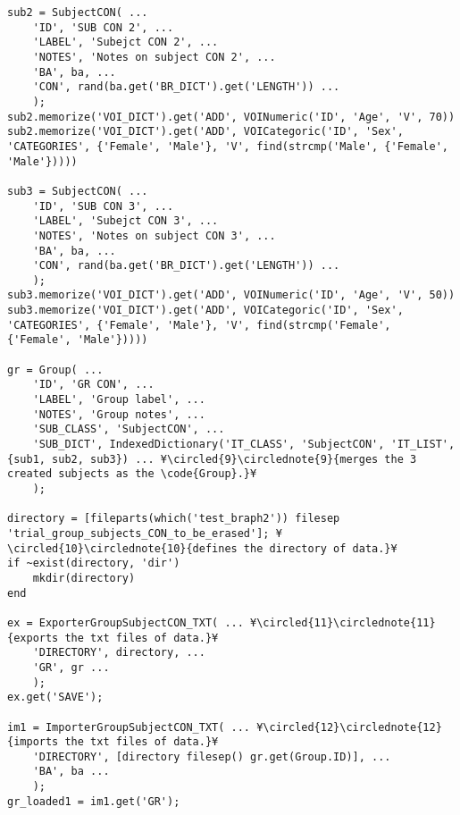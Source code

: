 \documentclass{tufte-handout}
\begin{document}
\begin{lstlisting}
sub2 = SubjectCON( ...
    'ID', 'SUB CON 2', ...
    'LABEL', 'Subejct CON 2', ...
    'NOTES', 'Notes on subject CON 2', ...
    'BA', ba, ...
    'CON', rand(ba.get('BR_DICT').get('LENGTH')) ...
    );
sub2.memorize('VOI_DICT').get('ADD', VOINumeric('ID', 'Age', 'V', 70))
sub2.memorize('VOI_DICT').get('ADD', VOICategoric('ID', 'Sex', 'CATEGORIES', {'Female', 'Male'}, 'V', find(strcmp('Male', {'Female', 'Male'}))))

sub3 = SubjectCON( ...
    'ID', 'SUB CON 3', ...
    'LABEL', 'Subejct CON 3', ...
    'NOTES', 'Notes on subject CON 3', ...
    'BA', ba, ...
    'CON', rand(ba.get('BR_DICT').get('LENGTH')) ...
    );
sub3.memorize('VOI_DICT').get('ADD', VOINumeric('ID', 'Age', 'V', 50))
sub3.memorize('VOI_DICT').get('ADD', VOICategoric('ID', 'Sex', 'CATEGORIES', {'Female', 'Male'}, 'V', find(strcmp('Female', {'Female', 'Male'}))))

gr = Group( ...
    'ID', 'GR CON', ...
    'LABEL', 'Group label', ...
    'NOTES', 'Group notes', ...
    'SUB_CLASS', 'SubjectCON', ...
    'SUB_DICT', IndexedDictionary('IT_CLASS', 'SubjectCON', 'IT_LIST', {sub1, sub2, sub3}) ... ¥\circled{9}\circlednote{9}{merges the 3 created subjects as the \code{Group}.}¥
    );

directory = [fileparts(which('test_braph2')) filesep 'trial_group_subjects_CON_to_be_erased']; ¥\circled{10}\circlednote{10}{defines the directory of data.}¥
if ~exist(directory, 'dir')
    mkdir(directory)
end

ex = ExporterGroupSubjectCON_TXT( ... ¥\circled{11}\circlednote{11}{exports the txt files of data.}¥
    'DIRECTORY', directory, ...
    'GR', gr ...
    );
ex.get('SAVE');

im1 = ImporterGroupSubjectCON_TXT( ... ¥\circled{12}\circlednote{12}{imports the txt files of data.}¥
    'DIRECTORY', [directory filesep() gr.get(Group.ID)], ...
    'BA', ba ...
    );
gr_loaded1 = im1.get('GR');


\end{lstlisting}
\end{document}
